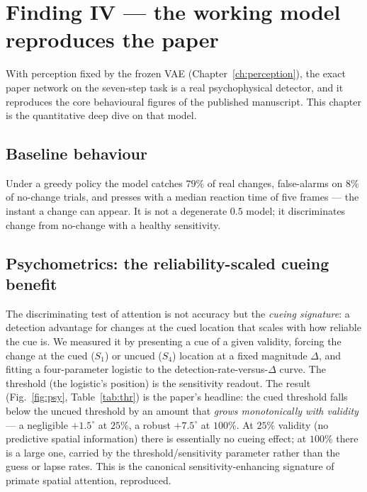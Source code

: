 \chapter{Finding IV --- the working model reproduces the paper}
\label{ch:deepdive}

With perception fixed by the frozen VAE (Chapter~\ref{ch:perception}), the exact paper
network on the seven-step task is a real psychophysical detector, and it reproduces the
core behavioural figures of the published manuscript. This chapter is the quantitative
deep dive on that model.

\section{Baseline behaviour}
Under a greedy policy the model catches $79\%$ of real changes, false-alarms on $8\%$ of
no-change trials, and presses with a median reaction time of five frames --- the instant a
change can appear. It is not a degenerate $0.5$ model; it discriminates change from
no-change with a healthy sensitivity.

\section{Psychometrics: the reliability-scaled cueing benefit}
The discriminating test of attention is not accuracy but the \emph{cueing signature}: a
detection advantage for changes at the cued location that scales with how reliable the cue
is. We measured it by presenting a cue of a given validity, forcing the change at the cued
($S_1$) or uncued ($S_4$) location at a fixed magnitude $\Delta$, and fitting a
four-parameter logistic to the detection-rate-versus-$\Delta$ curve. The threshold (the
logistic's position) is the sensitivity readout. The result (Fig.~\ref{fig:psy},
Table~\ref{tab:thr}) is the paper's headline:
the cued threshold falls below the uncued threshold by an amount that \emph{grows
monotonically with validity} --- a negligible $+1.5^\circ$ at $25\%$, a robust $+7.5^\circ$
at $100\%$. At $25\%$ validity (no predictive spatial information) there is essentially no
cueing effect; at $100\%$ there is a large one, carried by the threshold/sensitivity
parameter rather than the guess or lapse rates. This is the canonical sensitivity-enhancing
signature of primate spatial attention, reproduced.

